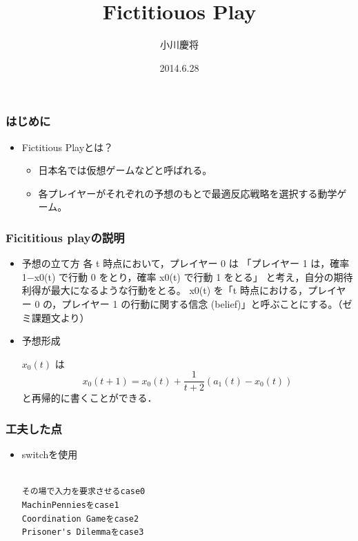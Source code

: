 \documentclass[dvipdfmx,fleqn,handout]{beamer}
\title{\Large Fictitiouos Play}
\author{\large 小川慶将}
\date{\small 2014.6.28}
\begin{document}
\sffamily
\gtfamily


\begin{frame}
  \titlepage
  \thispagestyle{empty}
\end{frame}

\setcounter{framenumber}{0}




\begin{frame}
\frametitle{はじめに}
\begin{itemize}\setlength{\parskip}{0.5em}
\item
Fictitious Playとは？
 \begin{itemize}\setlength{\parskip}{0.5em}
 \item
 日本名では仮想ゲームなどと呼ばれる。
 \item
 各プレイヤーがそれぞれの予想のもとで最適反応戦略を選択する動学ゲーム。
 \end{itemize}
\end{itemize}
\end{frame}



\begin{frame}
\frametitle{Ficititious playの説明}
\begin{itemize}\setlength{\parskip}{0.5em}
\item
予想の立て方
各 t 時点において，プレイヤー 0 は 「プレイヤー 1 は，確率 1−x0(t) で行動 0 をとり，確率 x0(t) で行動 1 をとる」 と考え，自分の期待利得が最大になるような行動をとる。
x0(t) を「t 時点における，プレイヤー 0 の，プレイヤー 1 の行動に関する信念 (belief)」と呼ぶことにする。（ゼミ課題文より）
\item
予想形成 \pause

$x_0(t)$ は
\[
x_0(t+1)
= x_0(t) + \frac{1}{t+2} (a_1(t) - x_0(t))
\]
と再帰的に書くことができる． \pause
\end{itemize}
\end{frame}


\begin{frame}[fragile]%
\frametitle{工夫した点}
\begin{itemize}\setlength{\parskip}{0.5em}
\item
switchを使用
\begin{verbatim}

その場で入力を要求させるcase0
MachinPenniesをcase1
Coordination Gameをcase2
Prisoner's Dilemmaをcase3

\end{verbatim}
\end{itemize}
\end{frame}
\end{document}
